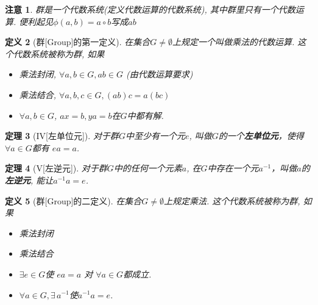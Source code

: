 \documentclass[UTF8]{ctexart}
\newtheorem{Definition}{定义}%
\newtheorem{Theorem}[Definition]{定理}
\newtheorem{Remark}[Definition]{注意}
\newtheorem{Lemma}[Definition]{引理}
\begin{document}
\begin{Remark}
群是一个代数系统(定义代数运算的代数系统), 其中群里只有一个代数运算. 便利起见$\phi(a, b) = a \circ b$写成$a b$
\end{Remark}

\begin{Definition}[群\mbox{[Group]}的第一定义]
在集合$G \neq \emptyset$上规定一个叫做乘法的代数运算. 这个代数系统被称为群, 如果
\begin{itemize}
	\item[\uppercase\expandafter{\romannumeral1}] 乘法封闭, $\forall a, b \in G, ab \in G$ (由代数运算要求)
	\item[\uppercase\expandafter{\romannumeral2}] 乘法结合, $\forall a, b, c \in G, (ab)c = a(bc)$
	\item[\uppercase\expandafter{\romannumeral3}] $ \forall a, b \in G$, $ax = b, ya = b$在$G$中都有解.
\end{itemize}
\end{Definition}

\begin{Theorem}[IV\mbox{[左单位元]}]
对于群$G$中至少有一个元$e$, 叫做$G$的一个\textbf{左单位元}，使得$\forall a \in G$都有 $ea = a$.
\end{Theorem}


\begin{Theorem}[V\mbox{[左逆元]}]
对于群$G$中的任何一个元素$a$, 在$G$中存在一个元$a^{-1}$，叫做$a$的\textbf{左逆元}, 能让$a^{-1} a = e$.
\end{Theorem}


\begin{Definition}[群\mbox{[Group]}的二定义]
在集合$G \neq \emptyset$上规定乘法. 这个代数系统被称为群, 如果
\begin{itemize}
	\item[\uppercase\expandafter{\romannumeral1}] 乘法封闭
	\item[\uppercase\expandafter{\romannumeral2}] 乘法结合
	\item[IV] $\exists e \in G$使 $ea =a$ 对 $\forall a \in G$都成立.
	\item[V]$\forall a \in G, \exists \, a^{-1}$使$a^{-1}a = e$.
\end{itemize}
\end{Definition}



\end{document}
